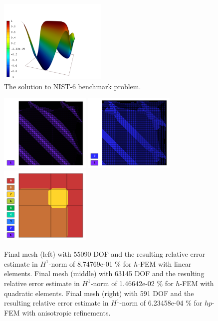 \documentclass[12pt]{elsarticle}
\begin{document}
\begin{figure}[!ht]
\centering
\includegraphics[height=4cm]{nist/nist-6/solution.png}
\caption{The solution to NIST-6 benchmark problem.}
\label{fig:sln-nist06}
\end{figure}

\begin{figure}[!ht]
\centering
\includegraphics[height=3.7cm]{nist/nist-6/mesh_h1_aniso.png}
\includegraphics[height=3.7cm]{nist/nist-6/mesh_h2_aniso.png}
\includegraphics[height=3.7cm]{nist/nist-6/mesh_hp_aniso.png}
\caption{
Final mesh (left) with 55090 DOF and the resulting
relative error estimate in $H^1$-norm of 8.74769e-01 \% for $h$-FEM with linear elements.
Final mesh (middle) with 63145 DOF and the resulting
relative error estimate in $H^1$-norm of 1.46642e-02 \% for $h$-FEM with quadratic elements.
Final mesh (right) with 591 DOF and the resulting
relative error estimate in $H^1$-norm of 6.23458e-04 \% for $hp$-FEM with anisotropic refinements.}
\label{fig:nist-6-hp-aniso}
\end{figure}
\end{document}
